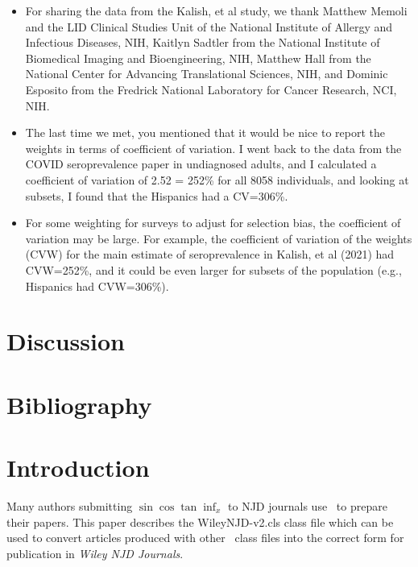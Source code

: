 \documentclass[AMA,STIX1COL]{WileyNJD-v2}
\begin{document}
\begin{itemize}
    \item For sharing the data from the Kalish, et al study, we thank Matthew Memoli and the LID Clinical Studies Unit of the National Institute of Allergy and Infectious Diseases, NIH,  Kaitlyn Sadtler from the National Institute of Biomedical Imaging and Bioengineering, NIH,   Matthew Hall from the National Center for Advancing Translational Sciences, NIH, and Dominic Esposito from the Fredrick National Laboratory for Cancer Research, NCI, NIH.
    \item The last time we met, you mentioned that it would be nice to report the weights in terms of coefficient of variation. I went back to the data from the COVID seroprevalence paper in undiagnosed adults, and I calculated a coefficient of variation  of 2.52 = 252\% for all 8058 individuals, and looking at subsets, I found that the Hispanics had a CV=306\%.  
    \item For some weighting for surveys to adjust for selection bias, the coefficient of variation may be large.  For example, the coefficient of variation of the weights (CVW) for the main estimate of seroprevalence in Kalish, et al (2021) had CVW=252\%, and it could be even larger for subsets of the population (e.g., Hispanics had CVW=306\%). 
\end{itemize}



\section{Discussion}

\section{Bibliography}
\nocite{*}%
%

\section{Introduction}\label{sec1}

Many authors submitting \( \sin \cos \tan \inf_{x} \) to NJD journals use \LaTeXe\ to
prepare their papers. This paper describes the
\textsf{WileyNJD-v2.cls} class file which can be used to convert
articles produced with other \LaTeXe\ class files into the correct
form for publication in \emph{Wiley NJD Journals}.
\end{document}
